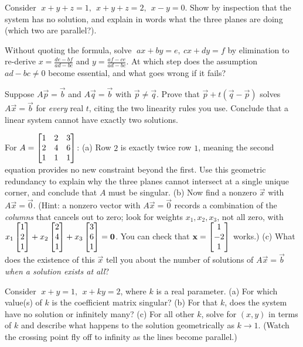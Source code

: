 \begin{exercise}
\label{ch06:ex-prism}
Consider $\;x+y+z=1,\ \ x+y+z=2,\ \ x-y=0$. Show by inspection that the
system has no solution, and explain in words what the three planes are doing
(which two are parallel?).
\end{exercise}

\begin{exercise}
\label{ch06:ex-inverse}
Without quoting the formula, solve $\;ax+by=e,\ cx+dy=f$ by elimination to
re-derive $x=\frac{de-bf}{ad-bc}$ and $y=\frac{af-ce}{ad-bc}$. At which step
does the assumption $ad-bc\neq0$ become essential, and what goes wrong if it
fails?
\end{exercise}

\begin{exercise}
\label{ch06:ex-proof}
Suppose $A\vec p=\vec b$ and $A\vec q=\vec b$ with $\vec p\neq\vec q$. Prove
that $\vec p + t(\vec q-\vec p)$ solves $A\vec x=\vec b$ for \emph{every} real
$t$, citing the two linearity rules you use. Conclude that a linear system
cannot have exactly two solutions.
\end{exercise}

\begin{exercise}
\label{ch06:ex-homog}
For $A=\begin{bmatrix}1 & 2 & 3\\ 2 & 4 & 6\\ 1 & 1 & 1\end{bmatrix}$:
(a) Row $2$ is exactly twice row $1$, meaning the second equation
provides no new constraint beyond the first. Use this geometric redundancy to
explain why the three planes cannot intersect at a single unique corner, and
conclude that $A$ must be singular. (b) Now find a nonzero $\vec x$ with
$A\vec x=\vec0$. (Hint: a nonzero vector with $A\vec x=\vec 0$ records a
combination of the \emph{columns} that cancels out to zero; look for weights
$x_1,x_2,x_3$, not all zero, with
$x_1\begin{bmatrix}1\\2\\1\end{bmatrix}+x_2\begin{bmatrix}2\\4\\1\end{bmatrix}+x_3\begin{bmatrix}3\\6\\1\end{bmatrix}=\mathbf{0}$. You can
check that $\mathbf{x}=\begin{bmatrix}1\\-2\\1\end{bmatrix}$ works.) (c) What does the existence of
this $\vec x$ tell you about the number of solutions of $A\vec x=\vec b$
\emph{when a solution exists at all}?
\end{exercise}

\begin{exercise}
\label{ch06:ex-param}
Consider $\;x+y=1,\ \ x+ky=2$, where $k$ is a real parameter.
(a) For which value(s) of $k$ is the coefficient matrix singular?
(b) For that $k$, does the system have no solution or infinitely many?
(c) For all other $k$, solve for $(x,y)$ in terms of $k$ and describe what
happens to the solution geometrically as $k\to1$. (Watch the crossing point
fly off to infinity as the lines become parallel.)
\end{exercise}
